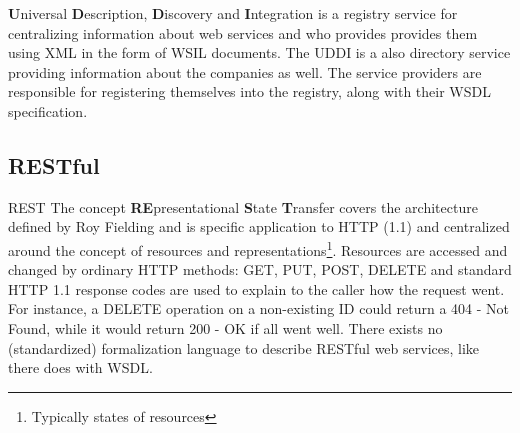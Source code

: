\textbf{U}niversal \textbf{D}escription, \textbf{D}iscovery and \textbf{I}ntegration is a registry service for centralizing information about web services and who provides provides them using XML in the form of WSIL documents. The UDDI is a also directory service providing information about the companies as well. The service providers are responsible for registering themselves into the registry, along with their WSDL specification.

\subsection{RESTful}
REST The concept \textbf{RE}presentational \textbf{S}tate \textbf{T}ransfer covers the architecture defined by Roy Fielding and is specific application to HTTP (1.1) and centralized around the concept of resources and representations\footnote{Typically states of resources}. Resources are accessed and changed by ordinary HTTP methods: GET, PUT, POST, DELETE and standard HTTP 1.1 response codes are used to explain to the caller how the request went. For instance, a DELETE operation on a non-existing ID could return a 404 - Not Found, while it would return 200 - OK if all went well. There exists no (standardized) formalization language to describe RESTful web services, like there does with WSDL.

